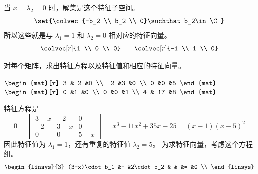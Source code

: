 \begin{exercises}
\begin{answer}
      当 $x=\lambda_2=0$ 时，解集是这个特征子空间。
      \begin{equation*}
        \set{\colvec{-b_2 \\ b_2 \\ 0}\suchthat b_2\in\C}
      \end{equation*}
      所以这些就是与 $\lambda_1=1$ 和 
      $\lambda_2=0$ 相对应的特征向量。
      \begin{equation*}
        \colvec[r]{1 \\ 0 \\ 0}
        \qquad
        \colvec[r]{-1 \\ 1 \\ 0}  
      \end{equation*}
    \end{answer}
  \recommended \item
    对每个矩阵，求出特征方程以及特征值和相应的特征向量。
    \begin{exparts*}
      \partsitem \( \begin{mat}[r]
              3  &-2 &0  \\
             -2  &3  &0  \\
              0  &0  &5
            \end{mat}  \)
      \partsitem \( \begin{mat}[r]
              0  &1   &0  \\
              0  &0   &1  \\
              4  &-17 &8
            \end{mat}  \)
    \end{exparts*}
    \begin{answer}
      \begin{exparts}
         \partsitem 特征方程是
           \begin{equation*}
             0=
             \begin{vmatrix}
              3-x  &-2   &0  \\
             -2    &3-x  &0  \\
              0    &0    &5-x
             \end{vmatrix}
             =x^3-11x^2+35x-25=(x-1)(x-5)^2
           \end{equation*}
           因此特征值为 $\lambda_1=1$，还有重复的特征值
           $\lambda_2=5$。
           为求特征向量，考虑这个方程组。
           \begin{equation*}
             \begin{linsys}{3}
               (3-x)\cdot b_1  &-  &2\cdot b_2      &   &   &=  &0  \\

\end{linsys}
\end{equation*}
\end{exparts}
\end{answer}
\end{exercises}
